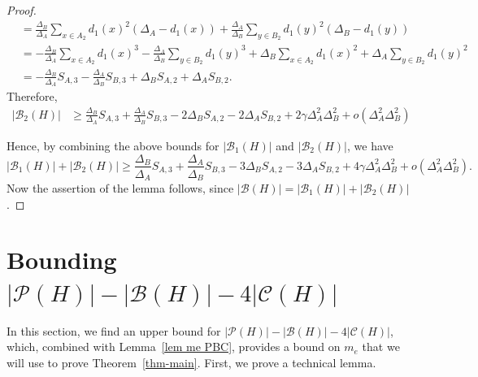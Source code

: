 \documentclass[11pt]{amsart}
\newcommand{\pp}{\mathcal{P}}
\newcommand{\cc}{\mathcal{C}}
\newcommand{\bb}{\mathcal{B}}
\begin{document}
\begin{proof}
\begin{align*}
    &=\frac{\Delta_B}{\Delta_A}\sum_{x\in A_2} d_1(x)^2(\Delta_A-d_1(x))+\frac{\Delta_A}{\Delta_B}\sum_{y\in B_2} d_1(y)^2(\Delta_B-d_1(y))\\
    &=-\frac{\Delta_B}{\Delta_A}\sum_{x\in A_2} d_1(x)^3 -\frac{\Delta_A}{\Delta_B} \sum_{y\in B_2} d_1(y)^3 + \Delta_B \sum_{x\in A_2} d_1(x)^2 + \Delta_A \sum_{y\in B_2} d_1(y)^2\\
     &=-\frac{\Delta_B}{\Delta_A}S_{A,3} -\frac{\Delta_A}{\Delta_B} S_{B,3} + \Delta_B S_{A,2} + \Delta_A S_{B,2} .
\end{align*}
Therefore,
    \begin{align*}
        |\bb_2(H)|&\ge    \frac{\Delta_B}{\Delta_A}S_{A,3}+\frac{\Delta_A}{\Delta_B} S_{B,3}- 2\Delta_B S_{A,2} -2\Delta_A S_{B,2} + 2\gamma \Delta_A^2\Delta_B^2
        +o(\Delta_A^2\Delta_B^2)
    \end{align*}
 
Hence, by combining the above bounds for $|\bb_1(H)|$ and $|\bb_2(H)|$, we have 
 \[
  |\bb_1(H)|+|\bb_2(H)|\ge  \frac{\Delta_B}{\Delta_A}S_{A,3}+\frac{\Delta_A}{\Delta_B} S_{B,3}- 3\Delta_B S_{A,2} -3\Delta_A S_{B,2} + 4\gamma \Delta_A^2\Delta_B^2
       +o(\Delta_A^2 \Delta_B^2). \]
Now the assertion of the lemma follows, since $|\bb(H)|=|\bb_1(H)|+|\bb_2(H)|$. 
\end{proof}

\section{Bounding $|\pp(H)|-|\bb(H)|-4|\cc(H)|$}\label{section3}
In this section, we find an upper bound for $|\pp(H)|-|\bb(H)|-4|\cc(H)|$, which, combined with Lemma~\ref{lem me PBC}, provides a bound on $m_e$ that we will use to prove Theorem~\ref{thm-main}. 
First, we prove a technical lemma. 
\end{document}
